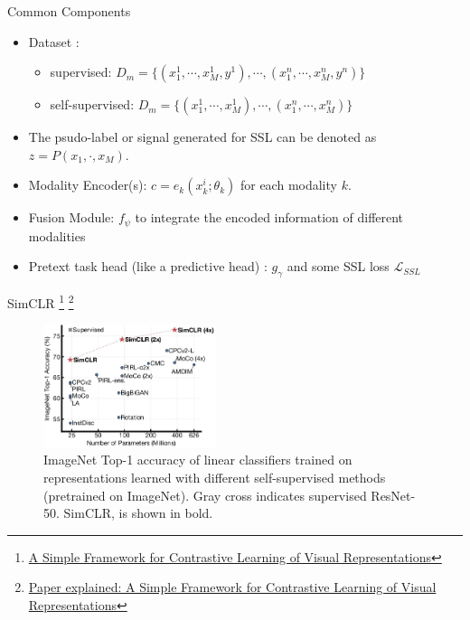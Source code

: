 \documentclass[serif, aspectratio=169]{beamer}
\begin{document}
\begin{frame}{Common Components}
    \begin{itemize}
        \item Dataset :
\begin{itemize}
\item supervised:  $D_m = \{ (x_1^1, \cdots, x_M^1, y^1), \cdots, (x_1^n, \cdots, x_M^n, y^n)  \}$
\item self-supervised:  $D_m = \{ (x_1^1, \cdots, x_M^1), \cdots, (x_1^n, \cdots, x_M^n)  \}$
\end{itemize}
\item The psudo-label or signal generated for SSL can be denoted as $z = P(x_1,\cdot,x_M)$.

        \item Modality Encoder(s): $c = e_k(x_k^i; \theta_k)$ for each modality $k$.
	\item Fusion Module: $f_\psi$ to integrate the encoded information of different modalities
	\item Pretext task head (like a predictive head) : $g_\gamma$ and some SSL loss $\mathcal{L}_{SSL}$

    \end{itemize}
\end{frame}


\begin{frame}{SimCLR
\footnote{\href{https://arxiv.org/pdf/2002.05709}{A Simple Framework for Contrastive Learning of Visual Representations}}
\footnote{\href{https://towardsdatascience.com/paper-explained-a-simple-framework-for-contrastive-learning-of-visual-representations-6a2a63bfa703}{Paper explained: A Simple Framework for Contrastive Learning of Visual Representations}}}
    \begin{figure}
        \setlength{\abovecaptionskip}{0pt}
        \setlength{\belowcaptionskip}{1pt}
        \centering
        \includegraphics[width=0.45\textwidth]{pic/simclr/1.png}
        \caption{ImageNet Top-1 accuracy of linear classifiers trained on representations learned with different self-supervised methods (pretrained on ImageNet). Gray cross indicates supervised ResNet-50. SimCLR, is shown in bold.}
   \end{figure}
\end{frame}
\end{document}

